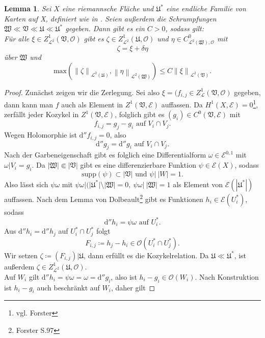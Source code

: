 \documentclass[11pt,a4paper]{scrartcl}
\theoremstyle{thm}
\newtheorem{lemma}{Lemma}[section]
\theoremstyle{def}
\theoremstyle{remark}
\newcommand{\norm}[1]{\left\lVert#1\right\rVert}
\begin{document}
\begin{lemma}
Sei $X$ eine riemannsche Fläche und $\mathfrak{U}^*$ eine endliche Familie von Karten auf X, definiert wie in . 
Seien außerdem die Schrumpfungen $\mathfrak{W}\ll\mathfrak{V}\ll\mathfrak{U}\ll\mathfrak{U}^*$ gegeben.
Dann gibt es ein $C>0$, sodass gilt:\\
Für alle $\xi\in Z^1_{\mathcal{L}^2}(\mathfrak{V},\mathcal{O})$ gibt es $\zeta\in Z^1_{\mathcal{L}^2}(\mathfrak{U},\mathcal{O})$ und $\eta\in C^0_{\mathcal{L}^2(\mathfrak{W}),\mathcal{O}}$ mit
\[
\zeta = \xi+\delta\eta
\]
über $\mathfrak{W}$ und
\[
\mathrm{max}\left( \norm{\zeta}_{\mathcal{L}^2(\mathfrak{U})},\norm{\eta}_{\mathcal{L}^2(\mathfrak{W})}\right)\leq C\norm{\xi}_{\mathcal{L}^2(\mathfrak{V})}.
\]
\end{lemma}
\begin{proof}
Zunächst zeigen wir die Zerlegung. Sei also $\xi=(f_{i,j}\in Z^1_{\mathcal{L}}(\mathfrak{V},\mathcal{O})$ gegeben, dann kann man $f$ auch als Element in $Z^1(\mathfrak{V},\mathcal{E})$ auffassen. Da $H^1(X,\mathcal{E})=0$\footnote{vgl. Forster}, zerfällt jeder Kozykel in $Z^1(\mathfrak{V},\mathcal{E})$, folglich gibt es $(g_i)\in C^0(\mathfrak{V},\mathcal{E})$ mit
\[
f_{i,j}=g_j-g_i\text{ auf } V_i\cap V_j.
\]
Wegen Holomorphie ist $\mathrm{d}''f_{i,j}=0$, also 
\[
\mathrm{d}''g_j = \mathrm{d}''g_i\text{ auf } V_i\cap V_j.
\]
Nach der Garbeneigenschaft gibt es folglich eine Differentialform $\omega\in\mathcal{E}^{0,1}$ mit $\omega|V_i=g_i$. Da $|\mathfrak{W}|\Subset|\mathfrak{V}|$ gibt es eine differenzierbare Funktion $\psi\in\mathcal{E}(X)$, sodass
\[
\mathrm{supp}(\psi)\subset|\mathfrak{V}|\text{ und } \psi|~|W|=1. 
\]
Also lässt sich $\psi\omega$ mit $\psi\omega|(|\mathfrak{U}^*|\setminus|\mathfrak{W}|=0,~\psi\omega|~|\mathfrak{W}|=1$ als Element von $\mathcal{E}(|\mathfrak{U}^*|)$ auffassen. Nach dem Lemma von Dolbeault\footnote{Forster S.97} gibt es Funktionen $h_i\in\mathcal{E}(U_i^*)$, sodass
\[
\mathrm{d}''h_i=\psi\omega\text{ auf } U_i^*.
\]
Aus $\mathrm{d}''h_i=\mathrm{d}''h_j$ auf $U_i^* \cap U_j^*$ folgt
\[
F_{i,j}\coloneqq h_j-h_i\in\mathcal{O}(U_i^*\cap U_j^*).
\]
Wir setzen $\zeta\coloneqq (F_{i,j})|\mathfrak{U}$, dann erfüllt es die Kozykelrelation. Da $\mathfrak{U}\ll\mathfrak{U}^*$, ist außerdem $\zeta\in Z^1_{\mathcal{L}^2}(\mathfrak{U},\mathcal{O})$.\\
Auf $W_i$ gilt $\mathrm{d}''h_i=\psi\omega=\omega=\mathrm{d}''g_i$, also ist $h_i-g_i\in\mathcal{O}(W_i)$.
Nach Konstruktion ist $h_i-g_i$ auch beschränkt auf $W_i$, daher gilt

\end{proof}
\end{document}
